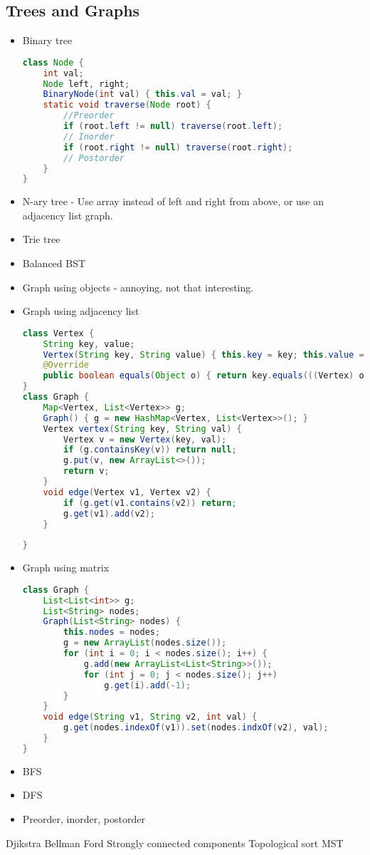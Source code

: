 \documentclass[10pt]{article}
\begin{document}
\subsection{Trees and Graphs}
\begin{itemize}
    \item Binary tree
\begin{lstlisting}[language=java]
class Node {
    int val;
    Node left, right;
    BinaryNode(int val) { this.val = val; }
    static void traverse(Node root) {
        //Preorder
        if (root.left != null) traverse(root.left);
        // Inorder
        if (root.right != null) traverse(root.right);
        // Postorder
    }
}
\end{lstlisting}
    \item N-ary tree - Use array instead of left and right from above, or use an adjacency list graph.
    \item Trie tree
    \item Balanced BST
    \item Graph using objects - annoying, not that interesting.
    \item Graph using adjacency list
\begin{lstlisting}[language=java]
class Vertex {
    String key, value;
    Vertex(String key, String value) { this.key = key; this.value = value; }
    @Override
    public boolean equals(Object o) { return key.equals(((Vertex) o).key); }
}
class Graph {
    Map<Vertex, List<Vertex>> g;
    Graph() { g = new HashMap<Vertex, List<Vertex>>(); }
    Vertex vertex(String key, String val) {
        Vertex v = new Vertex(key, val);
        if (g.containsKey(v)) return null;
        g.put(v, new ArrayList<>());
        return v;
    }
    void edge(Vertex v1, Vertex v2) {
        if (g.get(v1.contains(v2)) return;
        g.get(v1).add(v2);
    }
    
}
\end{lstlisting}
    \item Graph using matrix
\begin{lstlisting}[language=java]
class Graph {
    List<List<int>> g;
    List<String> nodes;
    Graph(List<String> nodes) {
        this.nodes = nodes;
        g = new ArrayList(nodes.size());
        for (int i = 0; i < nodes.size(); i++) {
            g.add(new ArrayList<List<String>>());
            for (int j = 0; j < nodes.size(); j++)
                g.get(i).add(-1);
        }
    }
    void edge(String v1, String v2, int val) {
        g.get(nodes.indexOf(v1)).set(nodes.indxOf(v2), val);
    }
}
\end{lstlisting}
    \item BFS
    \item DFS
    \item Preorder, inorder, postorder
\end{itemize}
Djikstra
Bellman Ford
Strongly connected components
Topological sort
MST
\end{document}
